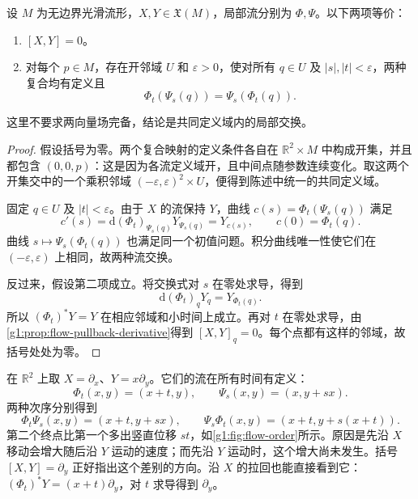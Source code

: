 \begin{theorem}
	\label{g1:thm:commuting-local-flows}
	设 \(M\) 为无边界光滑流形，\(X,Y\in\mathfrak X(M)\)，局部流分别为 \(\Phi,\Psi\)。以下两项等价：
	\begin{enumerate}
		\item \([X,Y]=0\)。
		\item 对每个 \(p\in M\)，存在开邻域 \(U\) 和 \(\varepsilon>0\)，使对所有 \(q\in U\) 及 \(|s|,|t|<\varepsilon\)，两种复合均有定义且
		\[
			\Phi_t(\Psi_s(q))=\Psi_s(\Phi_t(q)).
		\]
	\end{enumerate}
	这里不要求两向量场完备，结论是共同定义域内的局部交换。
\end{theorem}
\begin{proof}
	假设括号为零。两个复合映射的定义条件各自在 \(\mathbb R^2\times M\) 中构成开集，并且都包含 \((0,0,p)\)：这是因为各流定义域开，且中间点随参数连续变化。取这两个开集交中的一个乘积邻域 \((-\varepsilon,\varepsilon)^2\times U\)，便得到陈述中统一的共同定义域。

	固定 \(q\in U\) 及 \(|t|<\varepsilon\)。由于 \(X\) 的流保持 \(Y\)，曲线 \(c(s)=\Phi_t(\Psi_s(q))\) 满足
	\[
		c'(s)=\mathrm{d}(\Phi_t)_{\Psi_s(q)}Y_{\Psi_s(q)}
		=Y_{c(s)},\qquad c(0)=\Phi_t(q).
	\]
	曲线 \(s\mapsto\Psi_s(\Phi_t(q))\) 也满足同一个初值问题。积分曲线唯一性使它们在 \((-\varepsilon,\varepsilon)\) 上相同，故两种流交换。

	反过来，假设第二项成立。将交换式对 \(s\) 在零处求导，得到
	\[
		\mathrm{d}(\Phi_t)_qY_q=Y_{\Phi_t(q)}.
	\]
	所以 \((\Phi_t)^*Y=Y\) 在相应邻域和小时间上成立。再对 \(t\) 在零处求导，由\cref{g1:prop:flow-pullback-derivative}得到 \([X,Y]_q=0\)。每个点都有这样的邻域，故括号处处为零。
\end{proof}

\begin{example}
	\label{g1:exm:noncommuting-plane-flows}
	在 \(\mathbb R^2\) 上取 \(X=\partial_x\)、\(Y=x\partial_y\)。它们的流在所有时间有定义：
	\[
		\Phi_t(x,y)=(x+t,y),\qquad
		\Psi_s(x,y)=(x,y+sx).
	\]
	两种次序分别得到
	\[
		\Phi_t\Psi_s(x,y)=(x+t,y+sx),\qquad
		\Psi_s\Phi_t(x,y)=(x+t,y+s(x+t)).
	\]
	第二个终点比第一个多出竖直位移 \(st\)，如\cref{g1:fig:flow-order}所示。原因是先沿 \(X\) 移动会增大随后沿 \(Y\) 运动的速度；而先沿 \(Y\) 运动时，这个增大尚未发生。括号 \([X,Y]=\partial_y\) 正好指出这个差别的方向。沿 \(X\) 的拉回也能直接看到它：\((\Phi_t)^*Y=(x+t)\partial_y\)，对 \(t\) 求导得到 \(\partial_y\)。
\end{example}



